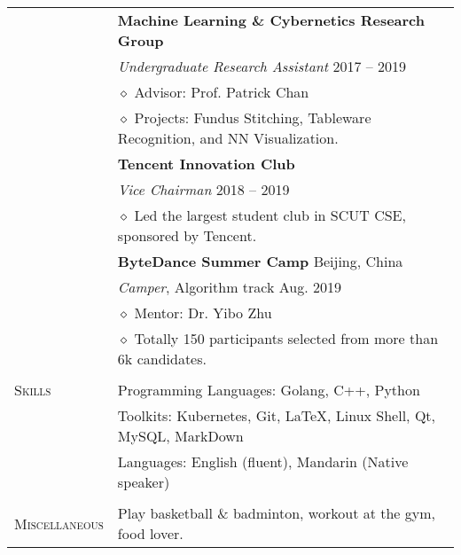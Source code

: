 \documentclass[letterpaper, 11pt]{article}
\begin{document}
\begin{longtable}{p{1in}p{5in}}
& \textbf{Machine Learning \& Cybernetics Research Group} \\
& \textit{Undergraduate Research Assistant} \hfill 2017 -- 2019 \\
& $\diamond$ Advisor: Prof. Patrick Chan \\
& $\diamond$ Projects: Fundus Stitching, Tableware Recognition, and NN Visualization. \\

& \textbf{Tencent Innovation Club} \\
& \textit{Vice Chairman} \hfill 2018 -- 2019 \\
& $\diamond$ Led the largest student club in SCUT CSE, sponsored by Tencent. \\

& \textbf{ByteDance Summer Camp} \hfill Beijing, China \\
& \textit{Camper}, Algorithm track \hfill Aug. 2019 \\
& $\diamond$ Mentor: Dr. Yibo Zhu \\
& $\diamond$ Totally 150 participants selected from more than 6k candidates. \\


& \\

\nohyphens{\textsc{Skills}}
& Programming Languages: Golang, C++, Python  \\
& Toolkits: Kubernetes, Git, \LaTeX, Linux Shell, Qt, MySQL, MarkDown \\
& Languages: English (fluent), Mandarin (Native speaker) \\
& \\


\nohyphens{\textsc{Miscellaneous}}
& Play basketball \& badminton, workout at the gym, food lover. \\


\end{longtable}
\end{document}
